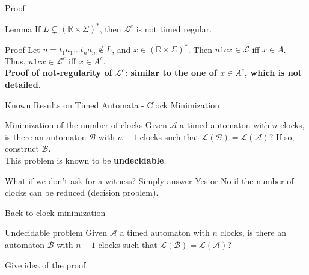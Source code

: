 \begin{frame}{Proof}

	\begin{block}{Lemma}
		If $L \subsetneq (\mathbb{R}\times\Sigma)^*$, then $\mathcal{L}^c$ is not timed regular.
	\end{block}
	
	\begin{block}{Proof}
	Let $u = t_1 a_1 \dots t_n a_n \not\in L$, and $x \in (\mathbb{R}\times\Sigma)^*$. Then $u 1 c x \in \mathcal{L}$ iff $x \in A$. Thus, $u 1 c x \in \mathcal{L}^c$ iff $x \in A^c$.\\
	\textbf{Proof of not-regularity of $\mathcal{L}^c$: similar to the one of $x \in A^c$, which is not detailed.}
	\end{block}

\end{frame}


\begin{frame}{Known Results on Timed Automata - Clock Minimization}

  \begin{alertblock}{Minimization of the number of clocks}
    Given $\mathcal{A}$ a timed automaton with $n$ clocks, is there an automaton $\mathcal{B}$ with $n-1$ clocks such that $\mathcal{L(B)=L(A)}$? If so, construct $\mathcal{B}$.\\
    This problem is known to be \textbf{undecidable}.
  \end{alertblock}
  \vfill
  \begin{exampleblock}{What if we don't ask for a witness?}
    Simply answer Yes or No if the number of clocks can be reduced (decision problem).
  \end{exampleblock}
    
\end{frame}

\begin{frame}{Back to clock minimization}
  
  \begin{alertblock}{Undecidable problem}
    Given $\mathcal{A}$ a timed automaton with $n$ clocks, is there an automaton $\mathcal{B}$ with $n-1$ clocks such that $\mathcal{L(B)=L(A)}$?
  \end{alertblock}

  Give idea of the proof.
  
\end{frame}
